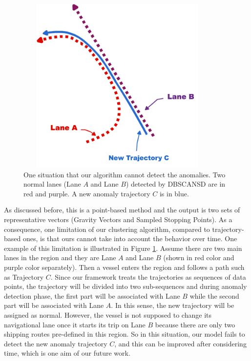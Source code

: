 \documentclass[12pt,glossary]{dalcsthesis}
\begin{document}
\begin{figure}[!htb]
\centering
\includegraphics[width=4in,height=3.5in]{limitation3.png}
\caption{One situation that our algorithm cannot detect the anomalies. Two normal lanes (Lane $A$ and Lane $B$) detected by DBSCANSD are in red and purple. A new anomaly trajectory $C$ is in blue.}
\label{fig:limitation3}
\end{figure}


As discussed before, this is a point-based method and the output is two sets of representative vectors (Gravity Vectors and Sampled Stopping Points). As a consequence, one limitation of our clustering algorithm, compared to trajectory-based ones, is that ours cannot take into account the behavior over time.  One example of this limitation is illustrated in Figure \ref{fig:limitation3}. Assume there are two main lanes in the region and they are Lane $A$ and Lane $B$ (shown in red color and purple color separately). Then a vessel enters the region and follows a path such as Trajectory $C$. Since our framework treats the trajectories as sequences of data points, the trajectory will be divided into two sub-sequences and during anomaly detection phase, the first part will be associated with Lane $B$ while the second part will be associated with Lane $A$. In this sense, the new trajectory will be assigned as normal. However, the vessel is not supposed to change its navigational lane once it starts its trip on Lane $B$ because there are only two shipping routes pre-defined in this region. So in this situation, our model fails to detect the new anomaly trajectory $C$, and this can be improved after considering time, which is one aim of our future work.
\end{document}
